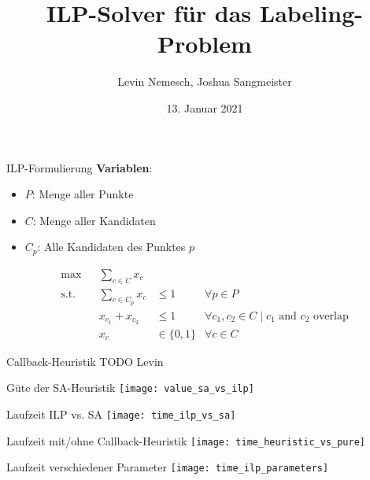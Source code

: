 \documentclass[ngerman,aspectratio=169,10pt]{beamer}
\title{ILP-Solver für das Labeling-Problem}
\date{13. Januar 2021}
\author{Levin Nemesch, Joshua Sangmeister}
\institute{Algorithm Engineering - Projekt}
\begin{document}
\maketitle

\begin{frame}{ILP-Formulierung}
	\textbf{Variablen}:
    \begin{itemize}
        \item $P$: Menge aller Punkte
        \item $C$: Menge aller Kandidaten
        \item $C_p$: Alle Kandidaten des Punktes $p$
    \end{itemize}

	\begin{align*}
	\max && \sum_{c\in C}x_c&&\\
	\text{s.t.} && \sum_{c\in C_p}x_c &\leq 1 &\forall p\in P\\
	&& x_{c_1} + x_{c_2} &\leq 1 &\forall c_1, c_2\in C \mid \text{$c_1$ and $c_2$ overlap}\\
	&& x_c &\in\{0,1\} &\forall c\in C
	\end{align*}
\end{frame}

\begin{frame}{Callback-Heuristik}
    \centering
    TODO Levin
\end{frame}

\begin{frame}{Güte der SA-Heuristik}
    \centering
    \texttt{[image: value\_sa\_vs\_ilp]}
\end{frame}

\begin{frame}{Laufzeit ILP vs. SA}
    \centering
    \texttt{[image: time\_ilp\_vs\_sa]}
\end{frame}

\begin{frame}{Laufzeit mit/ohne Callback-Heuristik}
    \centering
    \texttt{[image: time\_heuristic\_vs\_pure]}
\end{frame}

\begin{frame}{Laufzeit verschiedener Parameter}
    \centering
    \texttt{[image: time\_ilp\_parameters]}
\end{frame}
\end{document}

